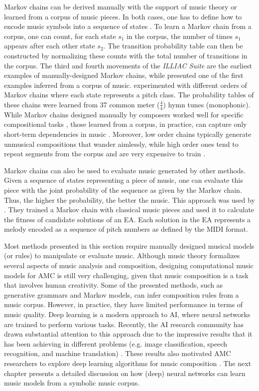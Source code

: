 Markov chains can be derived manually with the support of music theory  or learned from a corpus of music pieces. In both cases, one has to define how to encode music symbols into a sequence of states \cite{ames1989markov}. To learn a Markov chain from a corpus, one can count, for each state $s_1$ in the corpus, the number of times $s_1$ appears after each other state $s_2$. The transition probability table can then be constructed by normalizing these counts with the total number of transitions in the corpus.
The third and fourth movements of the \textit{ILLIAC Suite} are the earliest examples of
manually-designed Markov chains, while \citet{brooks1957} presented one of the first examples inferred from a corpus of music. \citet{brooks1957} experimented with different orders of Markov chains where each state represents a pitch class. The probability tables of these chains were learned from 37 common meter ($\frac{4}{4}$) hymn tunes (monophonic). While Markov chains designed manually by composers
worked well for specific compositional tasks \cite{tipei1975mp1, jones1981compositional, langston1989six},
those learned from a corpus, in practice, can capture only short-term dependencies in music
\cite{moorer1972music}. Moreover, low order chains typically generate unmusical compositions that
wander aimlessly, while high order ones tend to repeat segments from the corpus and are
very expensive to train \cite{moorer1972music}.

Markov chains can also be used to evaluate music generated by other methods. Given a sequence of states representing a piece of music, one can evaluate this piece with the joint probability of the sequence as given by the Markov chain. Thus, the higher the probability, the better the music. This approach was used by \citet{lo2006evolving}. They trained a Markov chain with classical music pieces and used it to calculate the fitness of candidate solutions of an EA. Each solution in the EA represents a melody encoded as a sequence of pitch numbers as defined by the MIDI format.

Most methods presented in this section require manually designed musical models (or rules) to manipulate or evaluate music. Although music theory formalizes several aspects of music analysis and composition, designing computational music models for AMC is still very challenging, given that music composition is a task that involves human creativity. Some of the presented methods, such as generative grammars and Markov models, can infer composition rules from a music corpus. However, in practice, they have limited performance in terms of music quality. Deep learning is a modern approach to AI, where neural networks are trained to perform various tasks. Recently, the AI research community has drawn substantial attention to this approach due to the impressive results that it has been achieving in different problems (e.g. image classification, speech recognition, and machine translation) \cite{lecun2015deep}. These results also motivated AMC researchers to explore deep learning algorithms for music composition \cite{briot2017deep}. The next chapter presents a detailed discussion on how (deep) neural networks can learn music models from a symbolic music corpus.
